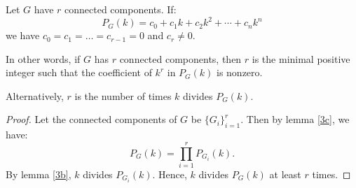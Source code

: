 \documentclass{unswmaths}
\begin{document}
\begin{lemma}[Part (d)]
    Let $G$ have $r$ connected components. If:
    \begin{equation*}
        P_G(k) = c_0 + c_1k+c_2k^2 + \cdots + c_nk^n
    \end{equation*}
    we have $c_0 = c_1 = \ldots = c_{r-1} = 0$
    and $c_r \neq 0$.
    
    In other words, if $G$ has $r$ connected components, then
    $r$ is the minimal positive integer such that the coefficient
    of $k^r$ in $P_G(k)$ is nonzero.
   
    Alternatively, $r$ is the number of times $k$ divides $P_G(k)$.
    
\end{lemma}
\begin{proof}
%    
%    
%    
%    
    
%    
%    
%    
    Let the connected components of $G$ be $\{G_i\}_{i=1}^r$. Then
    by lemma \ref{3c}, we have:
    \begin{equation*}
        P_G(k) = \prod_{i=1}^r P_{G_i}(k).
    \end{equation*}
    By lemma \ref{3b}, $k$ divides $P_{G_i}(k)$.
    Hence, $k$ divides $P_G(k)$ at least $r$ times.
\end{proof}
\end{document}

